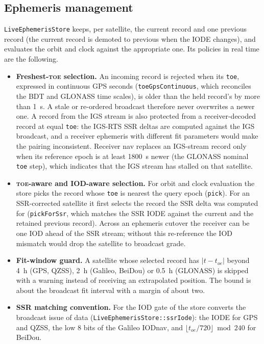 \documentclass[main.tex]{subfiles}
\begin{document}
\subsection{Ephemeris management}\label{sec:rt-eph}

\texttt{LiveEphemerisStore} keeps, per satellite, the current record and
one previous record (the current record is demoted to previous when the
IODE changes), and evaluates the orbit and clock against the appropriate
one.  Its policies in real time are the following.
\begin{itemize}[leftmargin=*, itemsep=0pt]
\item \textbf{Freshest-\textsc{toe} selection.}  An incoming record is
      rejected when its \texttt{toe}, expressed in continuous GPS
      seconds (\texttt{toeGpsContinuous}, which reconciles the BDT and
      GLONASS time scales), is older than the held record's by more than
      \SI{1}{\second}.  A stale or re-ordered broadcast therefore never
      overwrites a newer one.  A record from the IGS stream is also
      protected from a receiver-decoded record at equal \texttt{toe}:
      the IGS-RTS SSR deltas are computed against the IGS broadcast, and
      a receiver ephemeris with different fit parameters would make the
      pairing inconsistent.  Receiver nav replaces an IGS-stream record
      only when its reference epoch is at least \SI{1800}{\second} newer
      (the GLONASS nominal \texttt{toe} step), which indicates that the
      IGS stream has stalled on that satellite.
\item \textbf{\textsc{toe}-aware and IOD-aware selection.}  For orbit
      and clock evaluation the store picks the record whose
      \texttt{toe} is nearest the query epoch (\texttt{pick}).  For an
      SSR-corrected satellite it first selects the record the SSR delta
      was computed for (\texttt{pickForSsr}, which matches the SSR IODE
      against the current and the retained previous record).  Across an
      ephemeris cutover the receiver can be one IOD ahead of the SSR
      stream; without this re-reference the IOD mismatch would drop the
      satellite to broadcast grade.
\item \textbf{Fit-window guard.}  A satellite whose selected record has
      $|t - t_{oe}|$ beyond \SI{4}{\hour} (GPS, QZSS), \SI{2}{\hour} (Galileo,
      BeiDou) or \SI{0.5}{\hour} (GLONASS) is skipped with a warning instead of
      receiving an extrapolated position.  The bound is about the broadcast
      fit interval with a margin of about two.
\item \textbf{SSR matching convention.}  For the IOD gate of
       the store converts the
      broadcast issue of data (\texttt{LiveEphemerisStore::ssrIode}): the IODE
      for GPS and QZSS, the low 8 bits of the Galileo IODnav, and
      $\lfloor t_{oe}/720\rfloor \bmod 240$ for BeiDou.
\end{itemize}
\end{document}
